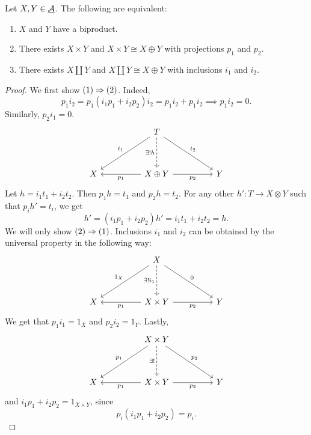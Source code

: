 \begin{theorem*}
	Let \( X, Y \in \underline{\mathcal A} \). The following are equivalent:
	\begin{enumerate}
		\item \( X \) and \( Y \) have a biproduct.
		\item There exists \( X \times Y \) and \( X \times Y \cong X \oplus Y \) with projections \( p_1 \) and \( p_2 \).
		\item There exists \( X \coprod Y \) and \( X \coprod Y \cong X \oplus Y \) with inclusions \( i_1 \) and \( i_2 \).
	\end{enumerate}
\end{theorem*}
\begin{proof}
	We first show \( (1) \Rightarrow (2) \). Indeed,
	\[
		p_1 i_2 = p_1 (i_1 p_1 + i_2 p_2) i_2 = p_1 i_2 + p_1 i_2 \implies p_1 i_2 = 0.
	\]
	Similarly, \( p_2 i_1 = 0 \).
	\[
		\begin{tikzcd}
			&& T \\
			\\
			X && {X \oplus Y} && Y
			\arrow["{t_1}"', from=1-3, to=3-1]
			\arrow["{\exists! h}"', dashed, from=1-3, to=3-3]
			\arrow["{t_2}", from=1-3, to=3-5]
			\arrow["{p_1}", from=3-3, to=3-1]
			\arrow["{p_2}"', from=3-3, to=3-5]
		\end{tikzcd}
	\]
	Let \( h = i_1 t_1 + i_2 t_2 \). Then \( p_1 h = t_1 \) and \( p_2 h = t_2 \). For any other \( h': T \to X \otimes Y \) such that \( p_i h' = t_i \), we get
	\[
		h' = (i_1 p_1 + i_2 p_2) h' = i_1 t_1 + i_2 t_2 = h.
	\]
	We will only show \( (2) \Rightarrow (1) \). Inclusions \( i_1 \) and \( i_2 \) can be obtained by the universal property in the following way:
	\[
		\begin{tikzcd}
			&& X \\
			\\
			X && {X \times Y} && Y
			\arrow["{1_X}"', from=1-3, to=3-1]
			\arrow["{\exists! i_1}"', dashed, from=1-3, to=3-3]
			\arrow["0", from=1-3, to=3-5]
			\arrow["{p_1}", from=3-3, to=3-1]
			\arrow["{p_2}"', from=3-3, to=3-5]
		\end{tikzcd}
	\]
	We get that \( p_1 i_1 = 1_X \) and \( p_2 i_2 = 1_Y \). Lastly,
	\[
		\begin{tikzcd}
			&& {X \times Y} \\
			\\
			X && {X \times Y} && Y
			\arrow["{p_1}"', from=1-3, to=3-1]
			\arrow["{\exists!}"', dashed, from=1-3, to=3-3]
			\arrow["{p_2}", from=1-3, to=3-5]
			\arrow["{p_1}", from=3-3, to=3-1]
			\arrow["{p_2}"', from=3-3, to=3-5]
		\end{tikzcd}
	\]
	and \( i_1 p_1 + i_2 p_2 = 1_{X \times Y} \), since
	\[
		p_i (i_1 p_1 + i_2 p_2) = p_i.
	\]
\end{proof}

